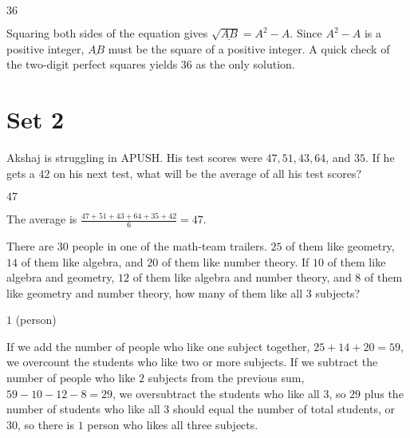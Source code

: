 \documentclass[11pt]{article}
\begin{document}
\begin{answer}
$\boxed{36}$
\end{answer}

\begin{solution}
Squaring both sides of the equation gives $\sqrt{\underline{AB}} = A^2 - A$. Since $A^2 - A$ is a positive integer, $\underline{AB}$ must be the square of a positive integer. A quick check of the two-digit perfect squares yields $\boxed{36}$ as the only solution.
\end{solution}

\newpage

\section*{Set 2}

\begin{problem}%
Akshaj is struggling in APUSH. His test scores were $47, 51, 43, 64$, and $35$. If he gets a $42$ on his next test, what will be the average of all his test scores?
\end{problem}

\begin{answer}
$\boxed{47}$
\end{answer}

\begin{solution}
The average is $\frac{47 + 51 + 43 + 64 + 35 + 42}{6} = \boxed{47}$.
\end{solution}


\begin{problem}%
There are $30$ people in one of the math-team trailers. $25$ of them like geometry, $14$ of them like algebra, and $20$ of them like number theory. If $10$ of them like algebra and geometry, $12$ of them like algebra and number theory, and $8$ of them like geometry and number theory, how many of them like all $3$ subjects?
\end{problem}

\begin{answer}
$\boxed{1}$ (person)
\end{answer}

\begin{solution}
If we add the number of people who like one subject together, $25 + 14 + 20 = 59$, we overcount the students who like two or more subjects. If we subtract the number of people who like $2$ subjects from the previous sum, $59 - 10 - 12 - 8 = 29$, we oversubtract the students who like all $3$, so $29$ plus the number of students who like all $3$ should equal the number of total students, or $30$, so there is $\boxed{1}$ person who likes all three subjects.
\end{solution}
\end{document}
